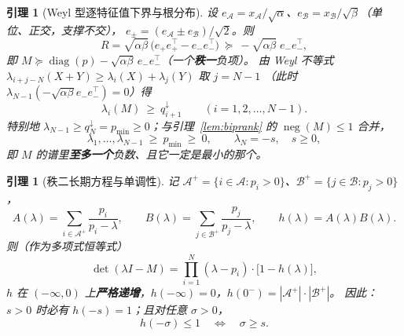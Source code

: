 \documentclass[UTF8,11pt]{ctexart}
\newtheorem{lemma}[theorem]{引理}
\theoremstyle{definition}
\begin{document}
\begin{lemma}[Weyl 型逐特征值下界与根分布]\label{lem:bipweyl}
设 $e_{\mathcal A}=x_{\mathcal A}/\sqrt\alpha$、$e_{\mathcal B}=x_{\mathcal B}/\sqrt\beta$（单位、正交，支撑不交），
$e_\pm=(e_{\mathcal A}\pm e_{\mathcal B})/\sqrt2$。则
\begin{equation}\label{eq:rank2b}
R=\sqrt{\alpha\beta}\,\bigl(e_+e_+^\top-e_-e_-^\top\bigr)\ \succeq\ -\sqrt{\alpha\beta}\;e_-e_-^\top ,
\end{equation}
即 $M\succeq\operatorname{diag}(p)-\sqrt{\alpha\beta}\,e_-e_-^\top$（一个\textbf{秩一}负项）。
由 Weyl 不等式 $\lambda_{i+j-N}(X+Y)\ge\lambda_i(X)+\lambda_j(Y)$ 取 $j=N-1$
（此时 $\lambda_{N-1}(-\sqrt{\alpha\beta}e_-e_-^\top)=0$）得
\begin{equation}\label{eq:weyl}
\lambda_i(M)\ \ge\ q^\downarrow_{i+1}\qquad(i=1,2,\dots,N-1).
\end{equation}
特别地 $\lambda_{N-1}\ge q^\downarrow_N=p_{\min}\ge0$；与引理~\ref{lem:biprank} 的 $\operatorname{neg}(M)\le1$ 合并，
\begin{equation}\label{eq:rootdist}
\lambda_1,\dots,\lambda_{N-1}\ \ge\ p_{\min}\ \ge\ 0,\qquad \lambda_N=-s,\quad s\ge0,
\end{equation}
即 $M$ 的谱里\textbf{至多一个}负数、且它一定是最小的那个。
\end{lemma}

\begin{lemma}[秩二长期方程与单调性]\label{lem:bipsec}
记 $\mathcal A^+=\{i\in\mathcal A:p_i>0\}$、$\mathcal B^+=\{j\in\mathcal B:p_j>0\}$，
\begin{equation}\label{eq:AB}
A(\lambda)=\sum_{i\in\mathcal A^+}\frac{p_i}{p_i-\lambda},\qquad
B(\lambda)=\sum_{j\in\mathcal B^+}\frac{p_j}{p_j-\lambda},\qquad h(\lambda)=A(\lambda)B(\lambda).
\end{equation}
则（作为多项式恒等式）
\begin{equation}\label{eq:secular}
\det(\lambda I-M)=\prod_{i=1}^{N}(\lambda-p_i)\cdot\bigl[1-h(\lambda)\bigr],
\end{equation}
$h$ 在 $(-\infty,0)$ 上\textbf{严格递增}，$h(-\infty)=0$，$h(0^-)=|\mathcal A^+|\cdot|\mathcal B^+|$。
因此：$s>0$ 时必有 $h(-s)=1$；且对任意 $\sigma>0$，
\begin{equation}\label{eq:mono}
h(-\sigma)\le1\quad\Longleftrightarrow\quad \sigma\ge s .
\end{equation}
\end{lemma}
\end{document}
